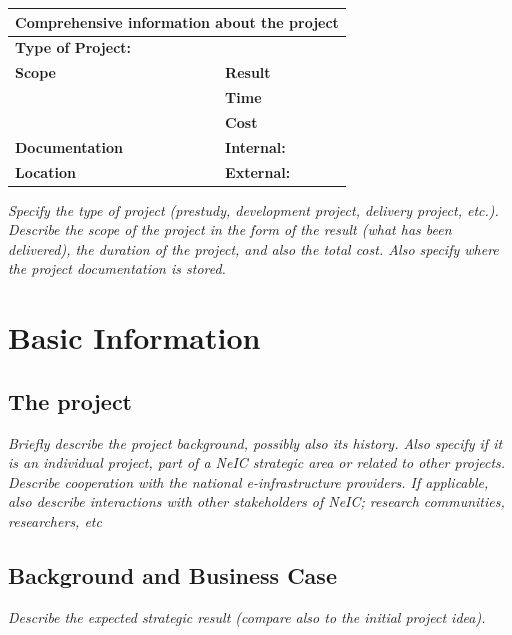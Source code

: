 \documentclass{article}
\begin{document}
\begin{center}
\begin{tabular}{|l| l| l|} \hline
\multicolumn{3}{|c|}{\bf Comprehensive information about the project} \\ \hline
\bf Type of Project: & \multicolumn{2}{|c|}{\bf } \\ \hline
\bf Scope & \bf Result & \\ \cline{2-3}
      & \bf Time & \\ \cline{2-3}
      & \bf Cost & \\ \hline
\bf Documentation & \multicolumn{2}{|l|}{\bf Internal: } \\
\bf Location & \multicolumn{2}{|l|}{\bf External: } \\ \hline
\end{tabular}
\end{center}
{\it Specify the type of project (prestudy, development project, delivery project, etc.). Describe the scope of the project in the form of the result (what has been delivered), the duration of the project, and also the total cost. Also specify where the project documentation is stored.}



\newpage
\tableofcontents
\newpage

\section{Basic Information}

\subsection{The project}
{\it Briefly describe the project background, possibly also its history. Also specify if it is an individual project, part of a NeIC strategic area or related to other projects. Describe cooperation with the national e-infrastructure providers. If applicable, also describe interactions with other stakeholders of NeIC; research communities, researchers, etc}

\subsection{Background and Business Case}
{\it Describe the expected strategic result (compare also to the initial project idea).}
\end{document}
